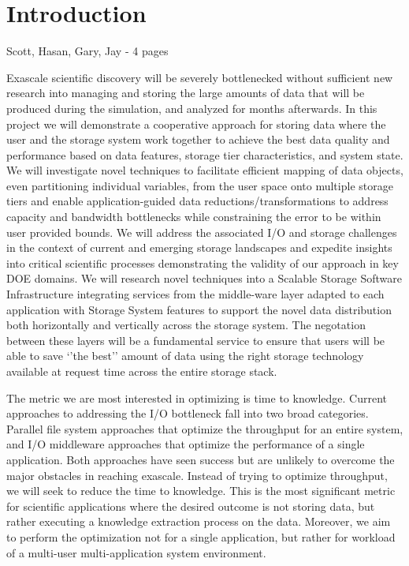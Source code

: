\section*{Introduction} {\color{red} Scott, Hasan, Gary, Jay - 4 pages}
\label{sec:introduction}

Exascale scientific discovery will be severely bottlenecked without
sufficient new research into managing and storing the large amounts of data
that will be produced during the simulation, and analyzed for months
afterwards.
%
In this project we will demonstrate a cooperative approach for storing data
where the user and the storage system work together to achieve the best data
quality and performance based on data features, storage tier characteristics,
and system state. We will investigate novel techniques to facilitate efficient
mapping of data objects, even partitioning individual variables, from the user
space onto multiple storage tiers and enable application-guided data
reductions/transformations to address capacity and bandwidth bottlenecks while
constraining the error to be within user provided bounds.
%
We will address the associated I/O and storage challenges in the context of
current and emerging storage landscapes and expedite insights into critical
scientific processes demonstrating the validity of our approach in key DOE
domains. We will research novel techniques into a Scalable
Storage Software Infrastructure integrating services from the middle-ware
layer adapted to each application with Storage System features to support the
novel data distribution both horizontally and vertically across the storage
system. The negotation between these layers will be a fundamental service 
to ensure that users will be able to save `'the best'' amount of data using the
right storage technology available at request time across the entire storage
stack.

The metric we are most interested in optimizing is time to knowledge.
Current approaches to addressing the I/O bottleneck fall into two broad
categories. Parallel file system approaches that optimize the throughput for
an entire system, and I/O middleware approaches that optimize the
performance of a single application. Both approaches have seen success but
are unlikely to overcome the major obstacles in reaching exascale. Instead
of trying to optimize throughput, we will seek to reduce the time to
knowledge. This is the most significant metric for scientific applications
where the desired outcome is not storing data, but rather executing a
knowledge extraction process on the data. Moreover, we aim to perform the
optimization not for a single application, but rather for workload of a
multi-user multi-application system environment.


